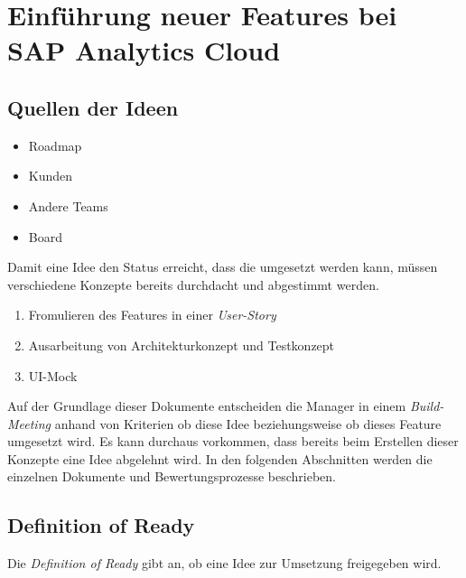 \section{Einführung neuer Features bei SAP Analytics Cloud}\label{sec:feature}


\subsection{Quellen der Ideen}
\begin{itemize}
    \item Roadmap
    \item Kunden
    \item Andere Teams 
    \item Board
\end{itemize}

Damit eine Idee den Status erreicht, dass die umgesetzt werden kann, müssen verschiedene Konzepte bereits durchdacht und abgestimmt werden. 
\begin{enumerate}
    \item Fromulieren des Features in einer \textit{User-Story}
    \item Ausarbeitung von Architekturkonzept und Testkonzept
    \item UI-Mock
\end{enumerate}
Auf der Grundlage dieser Dokumente entscheiden die Manager in einem \textit{Build-Meeting} anhand von Kriterien ob diese Idee beziehungsweise ob dieses Feature 
umgesetzt wird. Es kann durchaus vorkommen, dass bereits beim Erstellen dieser Konzepte eine Idee abgelehnt wird. In den folgenden Abschnitten werden
die einzelnen Dokumente und Bewertungsprozesse beschrieben.

\subsection{Definition of Ready}
Die \textit{Definition of Ready} gibt an, ob eine Idee zur Umsetzung freigegeben wird.


